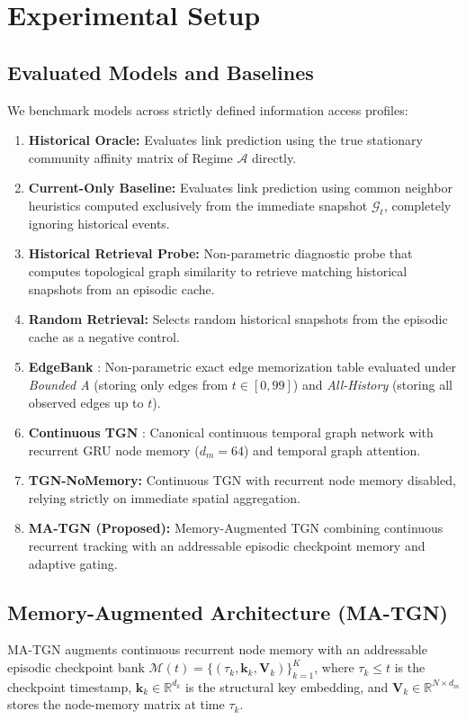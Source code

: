 \documentclass[10pt,twocolumn,letterpaper]{article}
\begin{document}
\section{Experimental Setup}
\label{sec:experimental_setup}

\subsection{Evaluated Models and Baselines}
We benchmark models across strictly defined information access profiles:
\begin{enumerate}
    \item \textbf{Historical Oracle:} Evaluates link prediction using the true stationary community affinity matrix of Regime $\mathcal{A}$ directly.
    \item \textbf{Current-Only Baseline:} Evaluates link prediction using common neighbor heuristics computed exclusively from the immediate snapshot $\mathcal{G}_t$, completely ignoring historical events.
    \item \textbf{Historical Retrieval Probe:} Non-parametric diagnostic probe that computes topological graph similarity to retrieve matching historical snapshots from an episodic cache.
    \item \textbf{Random Retrieval:} Selects random historical snapshots from the episodic cache as a negative control.
    \item \textbf{EdgeBank} \citep{poursafaei2022towards}: Non-parametric exact edge memorization table evaluated under \textit{Bounded A} (storing only edges from $t \in [0, 99]$) and \textit{All-History} (storing all observed edges up to $t$).
    \item \textbf{Continuous TGN} \citep{rossi2020temporal}: Canonical continuous temporal graph network with recurrent GRU node memory ($d_m=64$) and temporal graph attention.
    \item \textbf{TGN-NoMemory:} Continuous TGN with recurrent node memory disabled, relying strictly on immediate spatial aggregation.
    \item \textbf{MA-TGN (Proposed):} Memory-Augmented TGN combining continuous recurrent tracking with an addressable episodic checkpoint memory and adaptive gating.
\end{enumerate}

\subsection{Memory-Augmented Architecture (MA-TGN)}
MA-TGN augments continuous recurrent node memory with an addressable episodic checkpoint bank $\mathcal{M}(t) = \{(\tau_k, \mathbf{k}_k, \mathbf{V}_k)\}_{k=1}^K$, where $\tau_k \le t$ is the checkpoint timestamp, $\mathbf{k}_k \in \mathbb{R}^{d_k}$ is the structural key embedding, and $\mathbf{V}_k \in \mathbb{R}^{N \times d_m}$ stores the node-memory matrix at time $\tau_k$.
\end{document}
